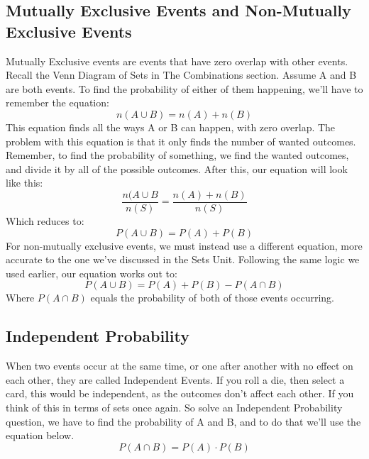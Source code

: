 \documentclass[final,1p,12pt]{elsarticle}
\begin{document}
    \subsection{Mutually Exclusive Events and Non-Mutually Exclusive Events}
    Mutually Exclusive events are events that have zero overlap with other events. Recall the Venn Diagram of Sets in The Combinations section. Assume A and B are both events. To find the probability of either of them happening, we'll have to remember the equation:
    \begin{equation*}
        n(A\cup B) = n(A) + n(B)
    \end{equation*}
    This equation finds all the ways A or B can happen, with zero overlap. The problem with this equation is that it only finds the number of wanted outcomes. Remember, to find the probability of something, we find the wanted outcomes, and divide it by all of the possible outcomes. After this, our equation will look like this:
    \begin{equation*}
        \frac{n(A \cup B}{n(S)} = \frac{n(A) + n(B)}{n(S)}
    \end{equation*}
    Which reduces to:
    \begin{equation*}
        P(A\cup B) = P(A) + P(B)
    \end{equation*}
    For non-mutually exclusive events, we must instead use a different equation, more accurate to the one we've discussed in the Sets Unit. Following the same logic we used earlier, our equation works out to:
    \begin{equation*}
        P(A\cup B) = P(A) + P(B) - P(A\cap B)
    \end{equation*}
    Where $P(A\cap B)$ equals the probability of both of those events occurring.

    \subsection{Independent Probability}
    When two events occur at the same time, or one after another with no effect on each other, they are called Independent Events. If you roll a die, then select a card, this would be independent, as the outcomes don't affect each other. If you think of this in terms of sets once again. So solve an Independent Probability question, we have to find the probability of A and B, and to do that we'll use the equation below.
    \begin{equation*}
        P(A\cap B) = P(A) \cdot P(B)
    \end{equation*}
    
\end{document}
